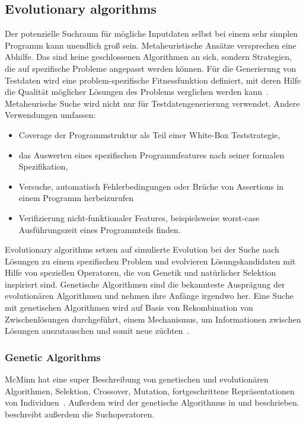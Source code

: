 \documentclass{article}
\begin{document}
\subsection{Evolutionary algorithms}
Der potenzielle Suchraum für mögliche Inputdaten selbst bei einem sehr simplen Programm kann unendlich groß sein. Metaheuristische Ansätze versprechen eine Abhilfe. Das sind keine geschlossenen Algorithmen an sich, sondern Strategien, die auf spezifische Probleme angepasst werden können. Für die Generierung von Testdaten wird eine problem-spezifische Fitnessfunktion definiert, mit deren Hilfe die Qualität möglicher Lösungen des Problems verglichen werden kann~\cite{McMinn_2004}. Metaheurische Suche wird nicht nur für Testdatengenerierung verwendet. Andere Verwendungen umfassen:
\begin{itemize}
	\item Coverage der Programmstruktur als Teil einer White-Box Teststrategie,
	\item das Auswerten eines spezifischen Programmfeatures nach seiner formalen Spezifikation,
	\item Versuche, automatisch Fehlerbedingungen oder Brüche von Assertions in einem Programm herbeizurufen
	\item Verifizierung nicht-funktionaler Features, beispielsweise worst-case Ausführungszeit eines Programmteils finden.
\end{itemize}
Evolutionary algorithms setzen auf simulierte Evolution bei der Suche nach Lösungen zu einem spezifischen Problem und evolvieren Lösungskandidaten mit Hilfe von speziellen Operatoren, die von Genetik und natürlicher Selektion inspiriert sind. Genetische Algorithmen sind die bekannteste Ausprägung der evolutionären Algorithmen und nehmen ihre Anfänge irgendwo her.  Eine Suche mit genetischen Algorithmen wird auf Basis von Rekombination von Zwischenlösungen durchgeführt, einem Mechanismus, um Informationen zwischen Lösungen auszutauschen und somit neue züchten~\cite{McMinn_2004}.

\subsubsection{Genetic Algorithms}
McMinn hat eine super Beschreibung von genetischen und evolutionären Algorithmen, Selektion, Crossover, Mutation, fortgeschrittene Repräsentationen von Individuen~\cite{McMinn_2004}. Außerdem wird der genetische Algorithmus in \cite{Fraser2011} und \cite{Fraser_2013} beschrieben. \cite{Fraser_2013} beschreibt außerdem die Suchoperatoren. 
\end{document}
